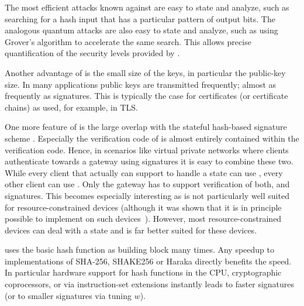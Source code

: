 The most efficient attacks known against \spx
are easy to state and analyze,
such as searching for a hash input that has a particular pattern of output bits.
The analogous quantum attacks are also easy to state and analyze,
such as using Grover's algorithm to accelerate the same search.
This allows precise quantification of the security levels provided by \spx.


Another advantage of \spx is the small size of the keys, in particular the public-key size.
In many applications public keys are transmitted frequently; almost as frequently as
signatures. This is typically the case for certificates (or certificate chains)
as used, for example, in TLS.

One more feature of \spx is the large overlap with the stateful hash-based 
signature scheme \xmss. Especially the verification code of \xmss is almost
entirely contained within the \spx verification code. Hence, in scenarios like
virtual private networks where clients authenticate towards a 
gateway using signatures it is easy to combine these two. While every client 
that actually can support to handle a state can use \xmss, every other client 
can use \spx. Only the gateway has to support verification of both, 
\xmss and \spx signatures. This becomes especially interesting as \spx is not
particularly well suited for resource-constrained devices (although it was 
shown that it is in principle possible to implement \spx on 
such devices~\cite{Hulsing2016}). However, most resource-constrained devices 
can deal with a state and \xmss is far better suited for these devices.

\spx uses the basic hash function as building block many times. Any speedup
to implementations of SHA-256, SHAKE256 or Haraka directly benefits the
\spx speed. In particular hardware support for hash functions in the CPU,
cryptographic coprocessors, 
or via instruction-set extensions instantly leads to faster \spx signatures
(or to smaller \spx signatures via tuning $w$).
